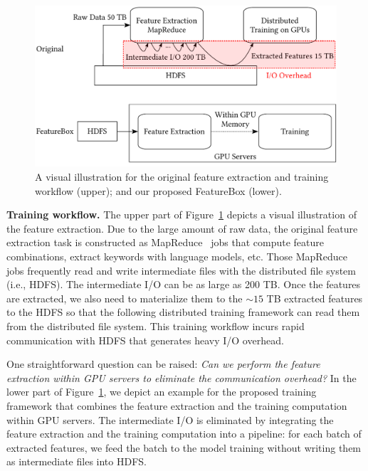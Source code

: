 \documentclass[conference]{IEEEtran}
\begin{document}
\begin{figure}[htbp]
\includegraphics[width=.5\textwidth]{figs/feabox.pdf}
\vspace{-0.15in}

\caption{A visual illustration for the original feature extraction and training workflow (upper); and our proposed FeatureBox (lower).}\label{fig:feabox}\vspace{-0.05in}
\end{figure}

\textbf{Training workflow.} 
The upper part of Figure~\ref{fig:feabox} depicts a visual illustration of the feature extraction. Due to the large amount of raw data, the original feature extraction task is constructed as MapReduce~\cite{dean2008mapreduce} jobs that compute feature combinations, extract keywords with language models, etc. 
Those MapReduce jobs frequently read and write intermediate files with the distributed file system (i.e., HDFS). The intermediate I/O can be as large as 200 TB. Once the features are extracted, we also need to materialize them to the $\sim$$15$ TB extracted features to the HDFS so that the following distributed training framework can read them from the distributed file system. 
This training workflow incurs rapid communication with HDFS that generates heavy I/O overhead. 

One straightforward question can be raised: \textit{Can we perform the feature extraction within GPU servers to eliminate the communication overhead?} 
In the lower part of Figure~\ref{fig:feabox}, we depict an example for the proposed training framework that combines the feature extraction and the training computation within GPU servers. The intermediate I/O is eliminated by integrating the feature extraction and the training computation into a pipeline: for each batch of extracted features, we feed the batch to the model training without writing them as intermediate files into HDFS.
\end{document}
